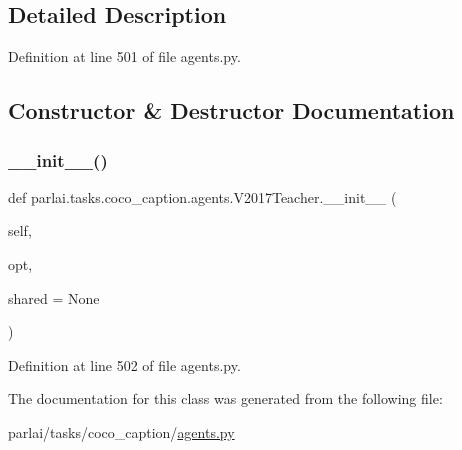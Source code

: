 \subsection{Detailed Description}


Definition at line 501 of file agents.\+py.



\subsection{Constructor \& Destructor Documentation}
\mbox{\label{classparlai_1_1tasks_1_1coco__caption_1_1agents_1_1V2017Teacher_a9e0aff09f69cd575af3238cab3a1d623}} 
\subsubsection{\texorpdfstring{\+\_\+\+\_\+init\+\_\+\+\_\+()}{\_\_init\_\_()}}
{\footnotesize\ttfamily def parlai.\+tasks.\+coco\+\_\+caption.\+agents.\+V2017\+Teacher.\+\_\+\+\_\+init\+\_\+\+\_\+ (\begin{DoxyParamCaption}\item[{}]{self,  }\item[{}]{opt,  }\item[{}]{shared = {\ttfamily None} }\end{DoxyParamCaption})}



Definition at line 502 of file agents.\+py.



The documentation for this class was generated from the following file\+:\begin{DoxyCompactItemize}
\item 
parlai/tasks/coco\+\_\+caption/\hyperlink{parlai_2tasks_2coco__caption_2agents_8py}{agents.\+py}\end{DoxyCompactItemize}
